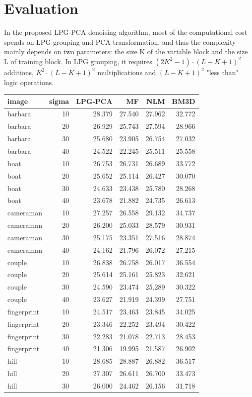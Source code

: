 \section{Evaluation}
In the proposed LPG-PCA denoising algorithm, most of the computational cost spends on LPG grouping and PCA transformation, and thus the complexity mainly depends on two parameters: the size K of the variable block and the size L of training block. In LPG grouping, it requires $(2K^2−1) \cdot (L−K+1)^2$ additions, $K^2 \cdot (L−K+1)^2$ multiplications and $(L−K+1)^2$ "less than" logic operations. \cite{zhang2010two} 

\begin{tabular}{lrrrrr}
\toprule
image&sigma&LPG-PCA&MF&NLM&BM3D\\
\midrule
barbara&10&28.379&27.540&27.962&32.772\\
barbara&20&26.929&25.743&27.594&28.966\\
barbara&30&25.680&23.905&26.754&27.032\\
barbara&40&24.522&22.245&25.511&25.558\\
boat&10&26.753&26.731&26.689&33.772\\
boat&20&25.652&25.114&26.427&30.070\\
boat&30&24.633&23.438&25.780&28.268\\
boat&40&23.678&21.882&24.735&26.613\\
cameraman&10&27.257&26.558&29.132&34.737\\
cameraman&20&26.200&25.033&28.579&30.931\\
cameraman&30&25.175&23.351&27.516&28.874\\
cameraman&40&24.162&21.796&26.072&27.215\\
couple&10&26.838&26.758&26.017&36.554\\
couple&20&25.614&25.161&25.823&32.621\\
couple&30&24.590&23.474&25.289&30.322\\
couple&40&23.627&21.919&24.399&27.751\\
fingerprint&10&24.517&23.463&23.845&34.025\\
fingerprint&20&23.346&22.252&23.494&30.422\\
fingerprint&30&22.283&21.078&22.713&28.453\\
fingerprint&40&21.306&19.995&21.587&26.902\\
hill&10&28.685&28.887&26.882&36.517\\
hill&20&27.307&26.611&26.700&33.473\\
hill&30&26.000&24.462&26.156&31.718\\

\end{tabular}
